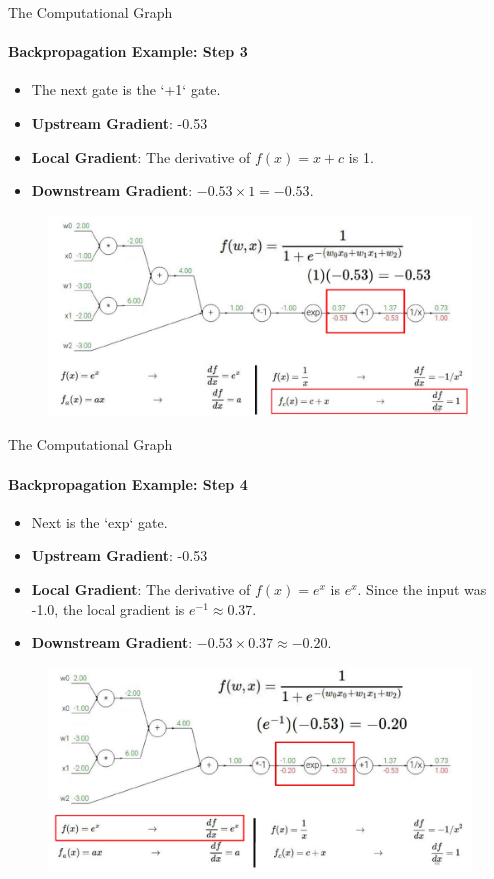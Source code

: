 \begin{frame}{The Computational Graph}
    \framesubtitle{Backpropagation Example: Step 3}
    \begin{itemize}
        \item The next gate is the `+1` gate.
        \item \textbf{Upstream Gradient}: -0.53
        \item \textbf{Local Gradient}: The derivative of $f(x) = x+c$ is 1.
        \item \textbf{Downstream Gradient}: $-0.53 \times 1 = -0.53$.
    \end{itemize}
    \begin{figure}
        \centering
        \includegraphics[width=\linewidth]{images/sigmoid_backprop_3.png}
    \end{figure}
\end{frame}

\begin{frame}{The Computational Graph}
    \framesubtitle{Backpropagation Example: Step 4}
    \begin{itemize}
        \item Next is the `exp` gate.
        \item \textbf{Upstream Gradient}: -0.53
        \item \textbf{Local Gradient}: The derivative of $f(x) = e^x$ is $e^x$. Since the input was -1.0, the local gradient is $e^{-1} \approx 0.37$.
        \item \textbf{Downstream Gradient}: $-0.53 \times 0.37 \approx -0.20$.
    \end{itemize}
    \begin{figure}
        \centering
        \includegraphics[width=\linewidth]{images/sigmoid_backprop_4.png}
    \end{figure}
\end{frame}

